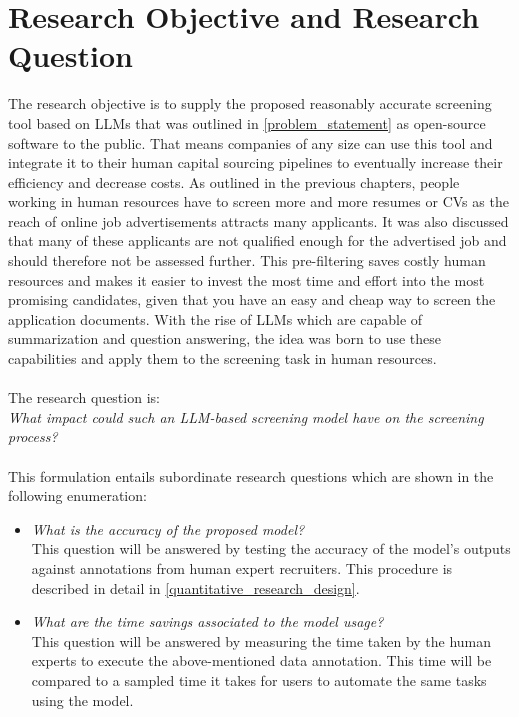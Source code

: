\documentclass[draft,final]{thesisclass} %
\begin{document}
\section{Research Objective and Research Question} \label{research_objective_and_research_question}
The research objective is to supply the proposed reasonably accurate screening tool based on \acs{LLM}s that was outlined in \ref{problem_statement} as open-source software to the public. 
That means companies of any size can use this tool and integrate it to their human capital sourcing pipelines to eventually increase their efficiency and decrease costs.
As outlined in the previous chapters, people working in human resources have to screen more and more resumes or \acs{CV}s as the reach of online job advertisements attracts many applicants.
It was also discussed that many of these applicants are not qualified enough for the advertised job and should therefore not be assessed further.
This pre-filtering saves costly human resources and makes it easier to invest the most time and effort into the most promising candidates, given that you have an easy and cheap way to screen the application documents.
With the rise of \acs{LLM}s which are capable of summarization and question answering, the idea was born to use these capabilities and apply them to the screening task in human resources.
\\\\
The research question is:\\
\textit{What impact could such an \acs{LLM}-based screening model have on the screening process?}\\\\
This formulation entails subordinate research questions which are shown in the following enumeration:
\begin{itemize}
    \item \textit{What is the accuracy of the proposed model?}\\
    This question will be answered by testing the accuracy of the model's outputs against annotations from human expert recruiters.
    This procedure is described in detail in \ref{quantitative_research_design}.
    \item \textit{What are the time savings associated to the model usage?}\\
    This question will be answered by measuring the time taken by the human experts to execute the above-mentioned data annotation.
    This time will be compared to a sampled time it takes for users to automate the same tasks using the model.
\end{itemize}
\end{document}

